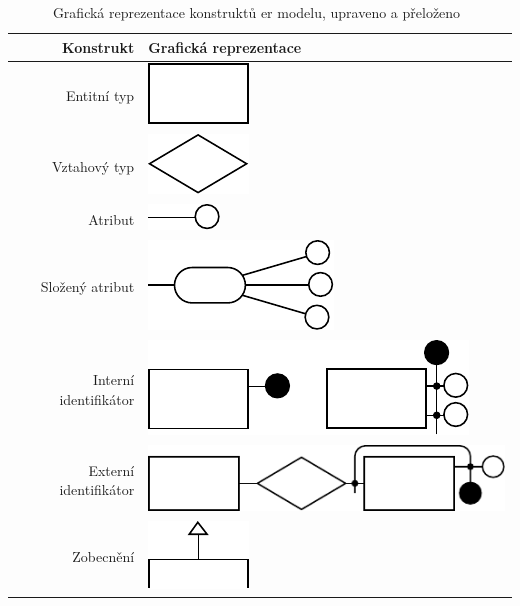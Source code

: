 \begin{table}[!htb]
  \centering
  \begin{tabular}{@{}rm{7cm}@{}} \toprule
    Konstrukt             & Grafická reprezentace                                     \\ \midrule
    Entitní typ           & {\centering\includegraphics{../img/er-model/entity.pdf}}  \\
    Vztahový typ          & \includegraphics{../img/er-model/relationship.pdf}        \\
    Atribut               & \includegraphics{../img/er-model/attribute.pdf}           \\
    Složený atribut       & \includegraphics{../img/er-model/composite-attribute.pdf} \\
    Interní identifikátor & \includegraphics{../img/er-model/identifier.pdf}          \\
    Externí identifikátor & \includegraphics{../img/er-model/external-identifier.pdf} \\
    Zobecnění             & \includegraphics{../img/er-model/generalization.pdf}      \\ \bottomrule
  \end{tabular}
  \caption[Grafická reprezentace konstruktů \acrshort{er} modelu]{Grafická reprezentace konstruktů \acrshort{er} modelu, upraveno a přeloženo~\cite[s.~164]{atzeni_database_1999}}
  \label{tab:er-constructs}
\end{table}

